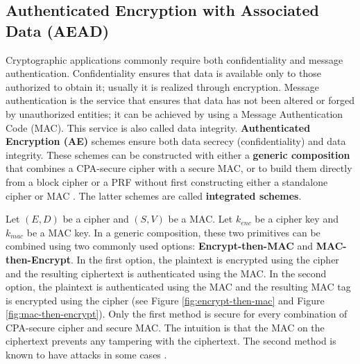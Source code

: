 \subsection{Authenticated Encryption with Associated Data (AEAD)}
Cryptographic applications commonly require both confidentiality and message authentication. Confidentiality ensures that data is available only to those authorized to obtain it; usually it is realized through encryption.  Message authentication is the service that ensures that data has not been altered or forged by unauthorized entities; it can be achieved by using a Message Authentication Code (MAC). This service is also called data integrity. \textbf{Authenticated Encryption (AE)} \cite{ae} schemes ensure both data secrecy (confidentiality) and data integrity. These schemes can be constructed with either a \textbf{generic composition} that combines a CPA-secure cipher with a secure MAC, or to build them directly from a block cipher or a PRF without first constructing either a standalone cipher or MAC \cite{gradcourse}. The latter schemes are called \textbf{integrated schemes}. 

Let $(E, D)$ be a cipher and $(S, V)$ be a MAC. Let $k_{enc}$ be a cipher key and $k_{mac}$ be a MAC key. In a generic composition, these two primitives can be combined using two commonly used options: \textbf{Encrypt-then-MAC} and \textbf{MAC-then-Encrypt}. In the first option, the plaintext is encrypted using the cipher and the resulting ciphertext is authenticated using the MAC. In the second option, the plaintext is authenticated using the MAC and the resulting MAC tag is encrypted using the cipher (see Figure \ref{fig:encrypt-then-mac} and Figure \ref{fig:mac-then-encrypt}). Only the first method is secure for every combination of CPA-secure cipher and secure MAC. The intuition is that the MAC on the ciphertext prevents any tampering with the ciphertext. The second method is known to have attacks in some cases \cite{gradcourse}. 

